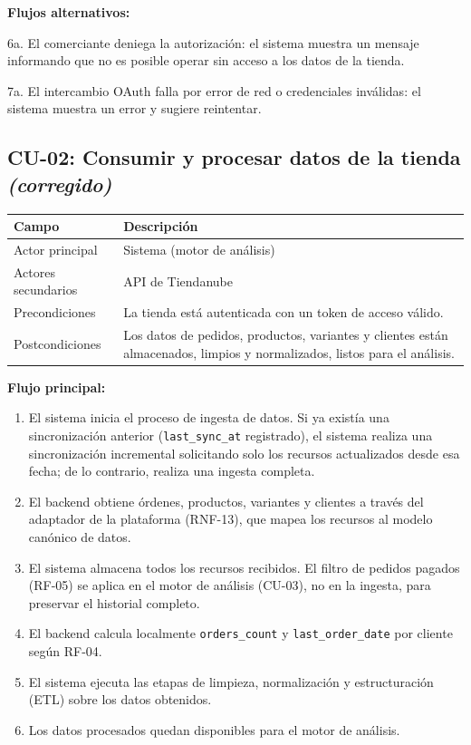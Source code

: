 \noindent\textbf{Flujos alternativos:}

\noindent 6a. El comerciante deniega la autorización: el sistema muestra un mensaje informando que no es posible operar sin acceso a los datos de la tienda.

\noindent 7a. El intercambio OAuth falla por error de red o credenciales inválidas: el sistema muestra un error y sugiere reintentar.

\subsection{CU-02: Consumir y procesar datos de la tienda \textit{(corregido)}}
\label{sec:cu-02}

\begin{table}[h]
\centering
\renewcommand{\arraystretch}{1.3}
\begin{tabular}{|m{3cm}|m{11.3cm}|}
\hline
\textbf{Campo} & \textbf{Descripción} \\
\hline
Actor principal & Sistema (motor de análisis) \\
\hline
Actores secundarios & API de Tiendanube \\
\hline
Precondiciones & La tienda está autenticada con un token de acceso válido. \\
\hline
Postcondiciones & Los datos de pedidos, productos, variantes y clientes están almacenados, limpios y normalizados, listos para el análisis. \\
\hline
\end{tabular}
\end{table}

\noindent\textbf{Flujo principal:}
\begin{enumerate}
    \item El sistema inicia el proceso de ingesta de datos. Si ya existía una sincronización anterior (\texttt{last\_sync\_at} registrado), el sistema realiza una sincronización incremental solicitando solo los recursos actualizados desde esa fecha; de lo contrario, realiza una ingesta completa.
    \item El backend obtiene órdenes, productos, variantes y clientes a través del adaptador de la plataforma (RNF-13), que mapea los recursos al modelo canónico de datos.
    \item El sistema almacena todos los recursos recibidos. El filtro de pedidos pagados (RF-05) se aplica en el motor de análisis (CU-03), no en la ingesta, para preservar el historial completo.
    \item El backend calcula localmente \texttt{orders\_count} y \texttt{last\_order\_date} por cliente según RF-04.
    \item El sistema ejecuta las etapas de limpieza, normalización y estructuración (ETL) sobre los datos obtenidos.
    \item Los datos procesados quedan disponibles para el motor de análisis.
\end{enumerate}

